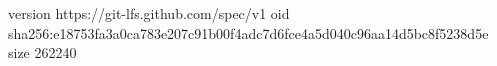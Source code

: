 version https://git-lfs.github.com/spec/v1
oid sha256:e18753fa3a0ca783e207c91b00f4adc7d6fce4a5d040c96aa14d5bc8f5238d5e
size 262240
